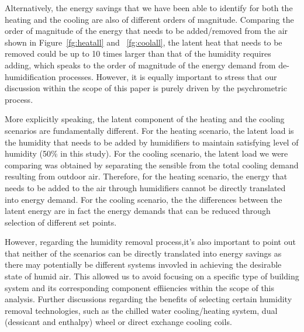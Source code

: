 
Alternatively, the energy savings that we have been able to identify for both the heating and the cooling are also of different orders of magnitude. Comparing the order of magnitude of the energy that needs to be added/removed from the air shown in Figure~\ref{fg:heatall} and ~\ref{fg:coolall}, the latent heat that needs to be removed could be up to 10 times larger than that of the humidity requires adding, which speaks to the order of magnitude of the energy demand from de-humidification processes. However, it is equally important to stress that our discussion within the scope of this paper is purely driven by the psychrometric process.

More explicitly speaking, the latent component of the heating and the cooling scenarios are fundamentally different. For the heating scenario, the latent load is the humidity that needs to be added by humidifiers to maintain satisfying level of humidity (50\% in this study). For the cooling scenario, the latent load we were comparing was obtained by separating the sensible from the total cooling demand resulting from outdoor air. Therefore, for the heating scenario, the energy that needs to be added to the air through humidifiers cannot be directly translated into energy demand. For the cooling scenario, the the differences between the latent energy are in fact the energy demands that can be reduced through selection of different set points.

However, regarding the humidity removal process,it's also important to point out that neither of the scenarios can be directly translated into energy savings as there may potentially be different systems invovled in achieving the desirable state of humid air. This allowed us to avoid focusing on a specific type of building system and its corresponding component effiiencies within the scope of this analysis. Further discussions regarding the benefits of selecting certain humidity removal technologies, such as the chilled water cooling/heating system, dual (dessicant and enthalpy) wheel or direct exchange cooling coils. 
